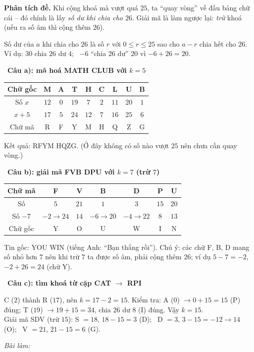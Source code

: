\documentclass[11pt]{article}
\newif\ifsol \solfalse
\newcommand{\StuProb}[2]{\begin{probboxS}{#1}{#2}\StuProbBody\end{probboxS}}
\newcommand{\probsol}[1]{%
  \begin{lrbox}{\solmeasure}\begin{minipage}{\dimexpr\linewidth-24pt\relax}#1\end{minipage}\end{lrbox}%
  \ifsol
    \begin{solbox}#1\end{solbox}%
  \else
    \setlength{\solht}{\dimexpr\ht\solmeasure+\dp\solmeasure+0.85cm\relax}%
    \ifdim\solht<1.35cm\setlength{\solht}{1.35cm}\fi
    \ifdim\solht>\StudentMaxWork\setlength{\solht}{\StudentMaxWork}\fi
    \par\noindent\begin{minipage}{\linewidth}%
    \expandafter\StuProb\StuProbArgs
    \begin{tcolorbox}[colback=white,colframe=Line,boxrule=0.8pt,arc=5pt,
      left=8pt,right=8pt,top=4pt,bottom=4pt,height=\solht]{\footnotesize\color{Slate}\itshape\WorkWord}\end{tcolorbox}%
    \end{minipage}\par\medskip
  \fi}
\newlength{\StudentMaxWork}\setlength{\StudentMaxWork}{4.5cm}
\newcommand{\step}[2]{\par\smallskip\noindent{\bfseries\color{tmBlue!85!black}\StepWord~#1.}\ {\bfseries #2}\par\nopagebreak}
\def\WorkWord{Bài làm:}
\def\StepWord{Bước}
\begin{document}
\probsol{
\textbf{Phân tích đề.} Khi cộng khoá mà vượt quá $25$, ta ``quay vòng'' về đầu bảng chữ cái -- đó chính là lấy \emph{số dư khi
chia cho $26$}. Giải mã là làm ngược lại: \emph{trừ} khoá (nếu ra số âm thì cộng thêm $26$).
\begin{recallbox}Số dư của $a$ khi chia cho $26$ là số $r$ với $0 \le r \le 25$ sao cho $a - r$ chia hết cho $26$.
Ví dụ: $30$ chia $26$ dư $4$; \ $-6$ ``chia $26$ dư'' $20$ vì $-6 + 26 = 20$.\end{recallbox}
\step{1}{Câu a): mã hoá \textsf{MATH CLUB} với $k = 5$}
\begin{center}\small
\begin{tabular}{|c|c|c|c|c|c|c|c|c|}
\hline
\rowcolor{tmBlue!10} Chữ gốc & M & A & T & H & C & L & U & B\\ \hline
Số $x$ & $12$ & $0$ & $19$ & $7$ & $2$ & $11$ & $20$ & $1$\\ \hline
$x + 5$ & $17$ & $5$ & $24$ & $12$ & $7$ & $16$ & $25$ & $6$\\ \hline
Chữ mã & R & F & Y & M & H & Q & Z & G\\ \hline
\end{tabular}
\end{center}
Kết quả: \textsf{RFYM HQZG}. (Ở đây không có số nào vượt $25$ nên chưa cần quay vòng.)
\step{2}{Câu b): giải mã \textsf{FVB DPU} với $k = 7$ (trừ $7$)}
\begin{center}\small
\begin{tabular}{|c|c|c|c|c|c|c|}
\hline
\rowcolor{tmBlue!10} Chữ mã & F & V & B & D & P & U\\ \hline
Số & $5$ & $21$ & $1$ & $3$ & $15$ & $20$\\ \hline
Số $- 7$ & $-2 \to 24$ & $14$ & $-6 \to 20$ & $-4 \to 22$ & $8$ & $13$\\ \hline
Chữ gốc & Y & O & U & W & I & N\\ \hline
\end{tabular}
\end{center}
Tin gốc: \textsf{YOU WIN} (tiếng Anh: ``Bạn thắng rồi''). Chú ý: các chữ F, B, D mang số nhỏ hơn $7$ nên khi trừ $7$ ta được số âm,
phải cộng thêm $26$; ví dụ $5 - 7 = -2$, $-2 + 26 = 24$ (chữ Y).
\step{3}{Câu c): tìm khoá từ cặp \textsf{CAT} $\to$ \textsf{RPI}}
C ($2$) thành R ($17$), nên $k = 17 - 2 = 15$. Kiểm tra: A ($0$) $\to 0 + 15 = 15$ (P) đúng; T ($19$) $\to 19 + 15 = 34$,
chia $26$ dư $8$ (I) đúng. Vậy $k = 15$.\\
Giải mã \textsf{SDV} (trừ $15$): S $= 18$, $18 - 15 = 3$ (D); \ D $= 3$, $3 - 15 = -12 \to 14$ (O); \ V $= 21$, $21 - 15 = 6$ (G).
}
\end{document}
